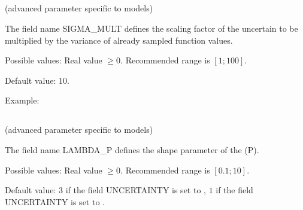 \documentclass[letterpaper,10pt,english]{sphinxmanual}
\begin{document}
\subsection{}
\label{\detokenize{SgteLib:sigma-mult}}\label{\detokenize{SgteLib:id24}}
\sphinxAtStartPar
(advanced parameter specific to {\hyperref[\detokenize{SgteLib:ensemble-stat}]{}} models)

\begin{DUlineblock}{0em}
\item[] The field name SIGMA\_MULT defines the scaling factor of the uncertain to be multiplied by the variance of already sampled function values.
\end{DUlineblock}

\begin{DUlineblock}{0em}
\item[] Possible values: Real value \(\geq 0\). Recommended range is \([1; 100]\).
\item[] Default value: \(10\).
\end{DUlineblock}

\begin{DUlineblock}{0em}
\item[] Example:
\item[] 
\end{DUlineblock}


\subsection{}
\label{\detokenize{SgteLib:lambda-p}}\label{\detokenize{SgteLib:id25}}
\sphinxAtStartPar
(advanced parameter specific to {\hyperref[\detokenize{SgteLib:ensemble-stat}]{}} models)

\begin{DUlineblock}{0em}
\item[] The field name LAMBDA\_P defines the shape parameter of the  (P).
\end{DUlineblock}

\begin{DUlineblock}{0em}
\item[] Possible values: Real value \(\geq 0\). Recommended range is \([0.1; 10]\).
\item[] Default value: \(3\) if the field UNCERTAINTY is set to , \(1\) if the field UNCERTAINTY is set to .
\end{DUlineblock}
\end{document}
